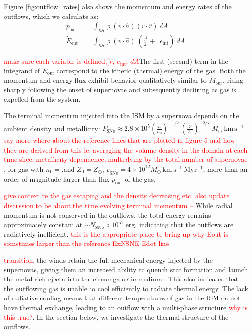 \documentclass[twocolumn,linenumbers]{aastex631}
\begin{document}
Figure \ref{fig:outflow_rates} also shows the momentum and energy rates of the outflows, which we calculate as:
\begin{align}
    \dot{p}_\mathrm{out} &= \int_{\partial S}\ \rho \ (v \cdot \hat{n}) (v \cdot \hat{r})\ dA \\
    \dot{E}_\mathrm{out} &= \int_{\partial S}\ \rho \ (v \cdot \hat{n})\ (\frac{v^2}{2} + \ \ e_\mathrm{int})\ dA.
\end{align}

\textcolor{red}{make sure each variable is defined,($\hat{r}$, $e_\mathrm{int}$, $dA$}The first (second) term in the integrand of $\dot{E}_\mathrm{out}$ correspond to the kinetic (thermal) energy of the gas. Both the momentum and energy flux exhibit behavior qualitatively similar to $\dot{M}_\mathrm{out}$, rising sharply following the onset of supernovae and subsequently declining as gas is expelled from the system. 

The terminal momentum injected into the ISM by a supernova depends on the ambient density and metallicity: $P_\mathrm{SNe} \approx 2.8\times 10^5 (\frac{n}{n_0})^{-1/7}\ (\frac{Z}{Z_0})^{-2/7}\ M_\odot\ \mathrm{km\ s^{-1}}$ \textcolor{red}{say more where about the reference lines that are plotted in figure 5 and how they are derived from this ie, averaging the volume density in the domain at each time slice, metallicity dependence, multiplying by the total number of supernovae}
\citep{2023ApJS..264...10K,1988ApJ...334..252C}. for gas with  $n_0 = $,and $Z_0 = Z_\odot$,  $\dot{p}_\mathrm{SNe} = 4\times 10^{12} M_\odot\ \mathrm{km\ s^{-1}\ Myr^{-1}}$, more than an order of magnitude larger than flux $\dot{p}_\mathrm{out}$ of the gas.

\textcolor{red}{give context re the gas escaping and the density decreasing etc. also update discussion to be about the time evolving terminal momentum -- } While radial momentum is not conserved in the outflows, the total energy remains approximately constant at $\sim N_\mathrm{SNe} \times 10^\mathrm{51}$ erg, indicating that the outflows are radiatively inefficient. \textcolor{red}{this is the appropriate place to bring up why Eout is sometimes larger than the reference ExNSNE Edot line}

\textcolor{red}{transition}, the winds retain the full mechanical energy injected by the supernovae, giving them an increased ability to quench star formation and launch the metal-rich ejecta into the circumgalactic medium \citep{1985Natur.317...44C}. This also indicates that the outflowing gas is unable to cool efficiently to radiate thermal energy. The lack of radiative cooling means that different temperatures of gas in the ISM do not have thermal exchange, leading to an outflow with a multi-phase structure \textcolor{red}{why is this true?}. In the section below, we investigate the thermal structure of the outflows.
\end{document}
